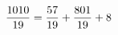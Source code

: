 \documentclass[preview]{standalone}
\begin{document}
\begin{align*}
\special{dvisvgm:raw <g id='unique000'>}\frac{1010}{19} = \frac{57}{19} + \frac{801}{19} + 8\special{dvisvgm:raw </g>}
\end{align*}
\end{document}
